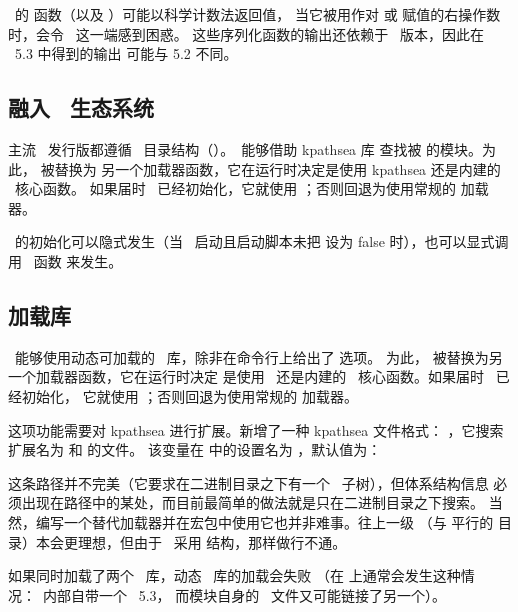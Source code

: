 \LUA\ 的  函数（以及 ）可能以科学计数法返回值，
当它被用作对  或  赋值的右操作数时，会令 \TEX\ 这一端感到困惑。
这些序列化函数的输出还依赖于 \LUA\ 版本，因此在 \LUA\ 5.3 中得到的输出
可能与 5.2 不同。

\subsection{融入 \TDS\ 生态系统}

主流 \TEX\ 发行版都遵循 \TEX\ 目录结构（\TDS）。\LUATEX\ 能够借助 kpathsea 库
查找被  的模块。为此， 被替换为
另一个加载器函数，它在运行时决定是使用 kpathsea 还是内建的 \LUA\ 核心函数。
如果届时 \KPATHSEA\ 已经初始化，它就使用 \KPATHSEA；否则回退为使用常规的
 加载器。

\KPATHSEA\ 的初始化可以隐式发生（当 \LUATEX\ 启动且启动脚本未把
 设为 false 时），也可以显式调用 \LUA\ 函数
 来发生。

\subsection{加载库}

\LUATEX\ 能够使用动态可加载的 \LUA\ 库，除非在命令行上给出了  选项。
为此， 被替换为另一个加载器函数，它在运行时决定
是使用 \KPATHSEA\ 还是内建的 \LUA\ 核心函数。如果届时 \KPATHSEA\ 已经初始化，
它就使用 \KPATHSEA；否则回退为使用常规的  加载器。

这项功能需要对 kpathsea 进行扩展。新增了一种 kpathsea 文件格式：
，它搜索扩展名为  和  的文件。
该变量在  中的设置名为 ，默认值为：


这条路径并不完美（它要求在二进制目录之下有一个 \TDS\ 子树），但体系结构信息
必须出现在路径中的某处，而目前最简单的做法就是只在二进制目录之下搜索。
当然，编写一个替代加载器并在宏包中使用它也并非难事。往上一级
（与  平行的  目录）本会更理想，但由于 \TEXLIVE\ 采用
 结构，那样做行不通。

如果同时加载了两个 \LUA\ 库，动态 \LUA\ 库的加载会失败
（在  上通常会发生这种情况：\LUATEX\ 内部自带一个 \LUA\ 5.3，
而模块自身的 \DLL\ 文件又可能链接了另一个）。

